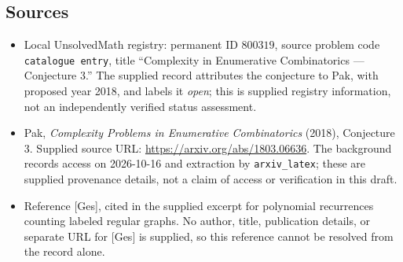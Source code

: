 \documentclass[11pt]{article}
\begin{document}
\subsection{Sources}
\begin{itemize}
\item Local UnsolvedMath registry: permanent ID \(800319\), source problem code \texttt{catalogue entry}, title ``Complexity in Enumerative Combinatorics --- Conjecture 3.'' The supplied record attributes the conjecture to Pak, with proposed year 2018, and labels it \emph{open}; this is supplied registry information, not an independently verified status assessment.
\item Pak, \emph{Complexity Problems in Enumerative Combinatorics} (2018), Conjecture 3. Supplied source URL: \url{https://arxiv.org/abs/1803.06636}. The background records access on 2026-10-16 and extraction by \texttt{arxiv\_latex}; these are supplied provenance details, not a claim of access or verification in this draft.
\item Reference [Ges], cited in the supplied excerpt for polynomial recurrences counting labeled regular graphs. No author, title, publication details, or separate URL for [Ges] is supplied, so this reference cannot be resolved from the record alone.
\end{itemize}
\end{document}
